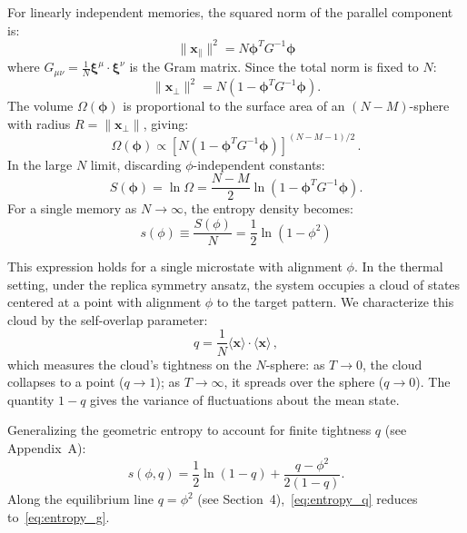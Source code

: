 \documentclass{article}
\theoremstyle{plain}
\theoremstyle{definition}
\theoremstyle{remark}
\begin{document}
For linearly independent memories, the squared norm of the parallel component is:
\begin{equation}
    \|\mathbf{x}_{\parallel}\|^2 = N \bm{\phi}^T G^{-1} \bm{\phi}
\end{equation}
where $G_{\mu\nu} = \frac{1}{N} \bm{\xi}^\mu \cdot \bm{\xi}^\nu$ is the Gram matrix. Since the total norm is fixed to $N$:
\begin{equation}
    \|\mathbf{x}_{\perp}\|^2 = N \left( 1 - \bm{\phi}^T G^{-1} \bm{\phi} \right).
\end{equation}
The volume $\Omega(\bm{\phi})$ is proportional to the surface area of an $(N-M)$-sphere with radius $R = \|\mathbf{x}_{\perp}\|$, giving:
\begin{equation}
    \Omega(\bm{\phi}) \propto \left[ N \left( 1 - \bm{\phi}^T G^{-1} \bm{\phi} \right) \right]^{(N-M-1)/2}\,.
\end{equation}
In the large $N$ limit, discarding $\phi$-independent constants:
\begin{equation}
    S(\bm{\phi}) = \ln \Omega = \frac{N-M}{2} \ln \left( 1 - \bm{\phi}^T G^{-1} \bm{\phi} \right).
\end{equation}
For a single memory as $N \to \infty$, the entropy density becomes:
\begin{equation}
    s(\phi) \equiv \frac{S(\phi)}{N} = \frac{1}{2} \ln ( 1 - \phi^2 )
	\label{eq:entropy_g}
\end{equation}

This expression holds for a single microstate with alignment $\phi$. In the thermal setting, under the replica symmetry ansatz, the system occupies a cloud of states centered at a point with alignment $\phi$ to the target pattern. We characterize this cloud by the self-overlap parameter:
\begin{equation}
    q = \frac{1}{N} \langle \bm{x} \rangle \cdot \langle \bm{x} \rangle\,,
\end{equation}
which measures the cloud's tightness on the $N$-sphere: as $T \to 0$, the cloud collapses to a point ($q \to 1$); as $T \to \infty$, it spreads over the sphere ($q \to 0$). The quantity $1-q$ gives the variance of fluctuations about the mean state.

Generalizing the geometric entropy to account for finite tightness $q$ (see Appendix~A):
\begin{equation}
    s(\phi, q) = \frac{1}{2} \ln(1-q) + \frac{q - \phi^2}{2(1-q)}.
	\label{eq:entropy_q}
\end{equation}
Along the equilibrium line $q = \phi^2$ (see Section~4),~\eqref{eq:entropy_q} reduces to~\eqref{eq:entropy_g}.
\end{document}
